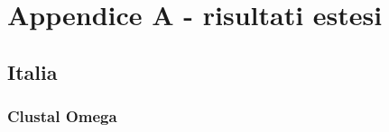 \documentclass[a4paper,10pt]{article}
\begin{document}
\newpage

\section{Appendice A - risultati estesi}

\newpage

\subsection{Italia}

\subsubsection{Clustal Omega}

\end{document}
